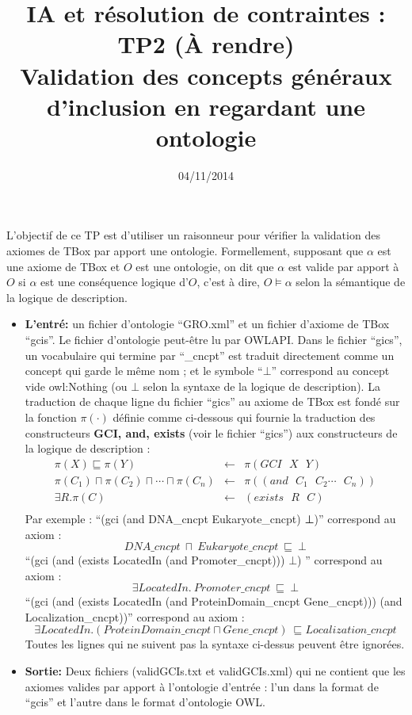 \documentclass{article}
\author{}
\title{\LARGE\bfseries IA et résolution de contraintes  : TP2 (À rendre) \\[10pt]
 \Large Validation des concepts généraux d'inclusion en regardant une ontologie}
\date{\vspace{-1cm} 04/11/2014}
\begin{document}
\maketitle

L’objectif de ce TP est d'utiliser un raisonneur pour vérifier la validation des axiomes de TBox par apport une ontologie. Formellement, supposant que $\alpha$ est une axiome de TBox et $O$ est une ontologie, on dit que $\alpha$ est valide par apport à $O$ si $\alpha$ est une conséquence logique d'$O$, c'est à dire, $O\models \alpha$ selon la sémantique de la logique de description.
\begin{itemize}
\item {\bf L'entré:} un fichier d'ontologie ``GRO.xml'' et un fichier d'axiome de TBox ``gcis''. Le fichier d'ontologie peut-être lu par OWLAPI. Dans le fichier ``gics'', un vocabulaire qui termine par ``\_cncpt'' est traduit directement comme un concept qui garde le même nom ; et le symbole ``$\bot$'' correspond au concept vide owl:Nothing (ou $\bot$ selon la syntaxe de la logique de description). La traduction de chaque ligne du fichier ``gics'' au axiome de TBox est fondé sur la fonction $\pi(\cdot)$ définie comme ci-dessous qui fournie la traduction des constructeurs {\bf GCI, and, exists}  (voir le fichier ``gics'') aux constructeurs de la logique de description :
\begin{eqnarray*}
\pi(X )\sqsubseteq \pi(Y) &\longleftarrow&	\pi(GCI \ \ \ X \ \ \ Y) \\
\pi(C_1)\sqcap \pi(C_2)\sqcap\cdots\sqcap \pi(C_n) &\longleftarrow& \pi((and\ \ \ C_1 \ \ \ C_2 \cdots \ \ \ C_n))\\
\exists R. \pi(C) &\longleftarrow& (exists\ \ \ R \ \ \ C)\\
\end{eqnarray*}
Par exemple :
``(gci (and DNA\_cncpt Eukaryote\_cncpt) ⊥)'' correspond au axiom : $$DNA\_cncpt\ \sqcap\ Eukaryote\_cncpt\ \sqsubseteq\ \bot$$
``(gci (and (exists LocatedIn (and Promoter\_cncpt))) $\bot$) '' correspond au axiom :
$$ \exists LocatedIn.\ Promoter\_cncpt\ \sqsubseteq\ \bot$$
``(gci (and (exists LocatedIn (and ProteinDomain\_cncpt Gene\_cncpt))) (and Localization\_cncpt))'' correspond au axiom : $$ \exists LocatedIn. (ProteinDomain\_cncpt \sqcap Gene\_cncpt) \ \sqsubseteq Localization\_cncpt$$
Toutes les lignes qui ne suivent pas la syntaxe ci-dessus peuvent être ignorées.
\item {\bf Sortie:} Deux fichiers (validGCIs.txt et validGCIs.xml) qui ne contient que  les axiomes valides par apport à l'ontologie d'entrée : l'un  dans la format de ``gcis'' et l'autre dans le format d'ontologie OWL.
\end{itemize}
\end{document}
